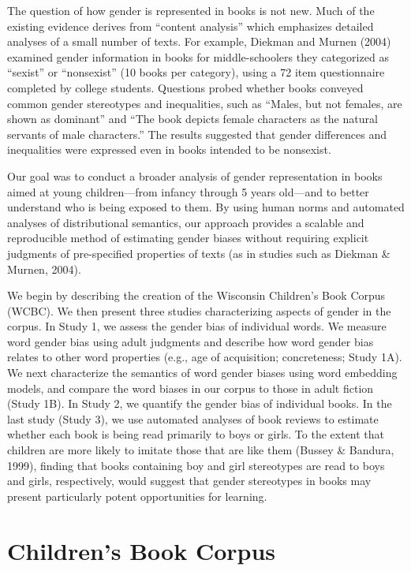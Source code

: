 \documentclass[english,,man,floatsintext]{apa6}
\begin{document}
The question of how gender is represented in books is not new. Much of the existing evidence derives from \enquote{content analysis} which emphasizes detailed analyses of a small number of texts. For example, Diekman and Murnen (2004) examined gender information in books for middle-schoolers they categorized as \enquote{sexist} or \enquote{nonsexist} (10 books per category), using a 72 item questionnaire completed by college students. Questions probed whether books conveyed common gender stereotypes and inequalities, such as \enquote{Males, but not females, are shown as dominant} and \enquote{The book depicts female characters as the natural servants of male characters.} The results suggested that gender differences and inequalities were expressed even in books intended to be nonsexist.

Our goal was to conduct a broader analysis of gender representation in books aimed at young children---from infancy through 5 years old---and to better understand who is being exposed to them. By using human norms and automated analyses of distributional semantics, our approach provides a scalable and reproducible method of estimating gender biases without requiring explicit judgments of pre-specified properties of texts (as in studies such as Diekman \& Murnen, 2004).

We begin by describing the creation of the Wisconsin Children's Book Corpus (WCBC). We then present three studies characterizing aspects of gender in the corpus. In Study 1, we assess the gender bias of individual words. We measure word gender bias using adult judgments and describe how word gender bias relates to other word properties (e.g., age of acquisition; concreteness; Study 1A). We next characterize the semantics of word gender biases using word embedding models, and compare the word biases in our corpus to those in adult fiction (Study 1B). In Study 2, we quantify the gender bias of individual books. In the last study (Study 3), we use automated analyses of book reviews to estimate whether each book is being read primarily to boys or girls. To the extent that children are more likely to imitate those that are like them (Bussey \& Bandura, 1999), finding that books containing boy and girl stereotypes are read to boys and girls, respectively, would suggest that gender stereotypes in books may present particularly potent opportunities for learning.

\hypertarget{childrens-book-corpus}{%
\section{Children's Book Corpus}\label{childrens-book-corpus}}
\end{document}
